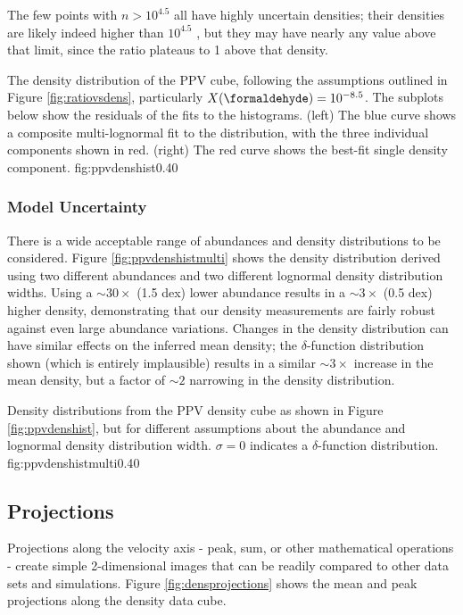 The few points with $n>10^{4.5}$ all have highly uncertain densities; their
densities are likely indeed higher than $10^{4.5}$ \percc, but they may have
nearly any value above that limit, since the \formaldehyde ratio plateaus to 1
above that density.


{The density distribution of the PPV cube, following the assumptions outlined
in Figure \ref{fig:ratiovsdens}, particularly $X(\formaldehyde)=10^{-8.5}$.
The subplots below show the residuals of the fits to the histograms.
(left)
The blue curve shows a composite multi-lognormal fit to the distribution,
with the three individual components shown in red.
(right) The red curve shows the best-fit single density component.}
{fig:ppvdenshist}{0.4}{0}

\subsubsection{Model Uncertainty}
There is a wide acceptable range of \formaldehyde abundances and \hh density
distributions to be considered.  Figure \ref{fig:ppvdenshistmulti} shows the
density distribution derived using two different abundances and two different
lognormal density distribution widths.  Using a $\sim30\times$ (1.5 dex) lower
abundance results in a $\sim3\times$ (0.5 dex) higher density, demonstrating
that our density measurements are fairly robust against even large abundance
variations.  Changes in the density distribution can have similar effects on
the inferred mean density; the $\delta$-function distribution shown (which is
entirely implausible) results in a similar $\sim3\times$ increase in the mean
density, but a factor of $\sim2$ narrowing in the density distribution.

{Density distributions from the PPV density cube as shown in Figure
\ref{fig:ppvdenshist}, but for different assumptions about the \formaldehyde
abundance and lognormal density distribution width.  $\sigma=0$ indicates a
$\delta$-function distribution.}
{fig:ppvdenshistmulti}{0.4}{0}


\subsection{Projections}
Projections along the velocity axis - peak, sum, or other mathematical
operations - create simple 2-dimensional images that can be readily compared to
other data sets and simulations.  Figure \ref{fig:densprojections} shows the
mean and peak projections along the density data cube.  

